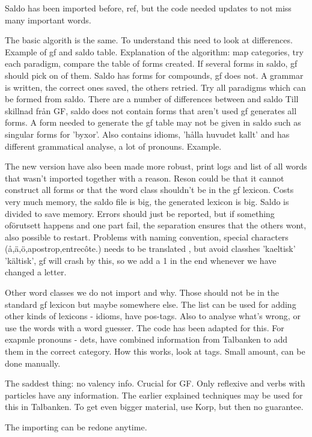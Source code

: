 \documentclass{report}
\begin{document}
Saldo has been imported before, ref, but the code needed updates to not miss
many important words.

The basic algorith is the same. To understand this need to look at differences.
Example of gf and saldo table.
Explanation of the algorithm: map categories, try each paradigm, compare the table of forms
created. If several forms in saldo, gf should pick on of them. Saldo has forms for
compounds, gf does not. A grammar is written, the correct ones saved, the others 
retried. Try all paradigms which can be formed from saldo. 
There are a number of differences between and saldo Till skillnad från GF,
saldo does not contain forms that aren't used gf generates all forms. A form
needed to generate the gf table may not be given in saldo such as singular
forms for 'byxor'. Also contains idioms, 'hålla huvudet kallt' and has
different grammatical analyse, a lot of pronouns. Example. 

The new version have also been made more robust, print logs and list of all
words that wasn't imported together with a reason. Reson could be that it
cannot construct all forms or that the word class shouldn't be in the gf lexicon.
Costs very much memory, the saldo file is big, the generated lexicon is big.
Saldo is divided to save memory. Errors should just be reported, but if something oförutsett
happens and one part fail, the separation ensures that the others wont, also
possible to restart. Problems with naming convention, special
characters (å,ä,ö,apostrop,entrecôte.) needs to be translated , but avoid
classhes 'kaeltisk' 'kältisk', gf will crash by this, so we add a 1
in the end whenever we have changed a letter.

Other word classes we do not import and why.
Those should not be in the standard gf lexicon but maybe somewhere else.
The list can be used for adding other kinds of lexicons - idioms, have pos-tags.
Also to analyse what's wrong, or use the words with a word guesser. The code
has been adapted for this.
For exapmle pronouns - dets, have combined information from Talbanken to add them in the correct
category. How this works, look at tags. Small amount, can be done manually.

The saddest thing: no valency info. Crucial for GF. Only reflexive and verbs with particles
have any information. The earlier explained techniques may be used for this in Talbanken.
To get even bigger material, use Korp, but then no guarantee.

The importing can be redone anytime.
\end{document}
